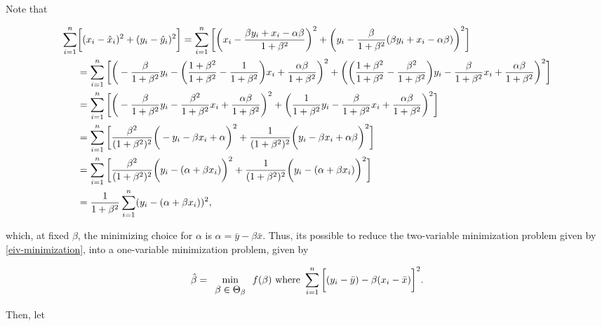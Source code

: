 \documentclass{homework}
\begin{document}
Note that 

\begin{align*}
    \sum_{i=1}^{n} & \bigg[(x_i - \hat{x}_i)^2+(y_i - \hat{y}_i)^2 \bigg] = \sum_{i=1}^{n} \bigg[\bigg(x_i - \frac{\beta y_i+x_i-\alpha\beta}{1+\beta ^2} \bigg)^2 + \bigg(y_i- \frac{\beta}{1+\beta ^2}(\beta y_i + x_i - \alpha \beta )\bigg)^2  \bigg] \\
    &= \sum_{i=1}^{n} \bigg[\bigg(- \frac{\beta}{1+\beta^2} y_i - \bigg(\frac{1+\beta^2}{1+\beta^2}-\frac{1}{1+\beta^2} \bigg)x_i + \frac{\alpha \beta}{1+\beta^2}\bigg)^2 + \bigg(\bigg(\frac{1+\beta^2}{1+\beta^2}- \frac{\beta^2}{1+\beta^2} \bigg)y_i - \frac{\beta}{1+\beta^2}x_i + \frac{\alpha \beta}{1+\beta^2} \bigg)^2 \bigg] \\
    &= \sum_{i=1}^{n} \bigg[\bigg(- \frac{\beta}{1+\beta^2} y_i -\frac{\beta^2}{1+\beta^2} x_i + \frac{\alpha \beta}{1+\beta^2}\bigg)^2 + \bigg( \frac{1}{1+\beta^2}y_i - \frac{\beta}{1+\beta^2}x_i + \frac{\alpha \beta}{1+\beta^2} \bigg)^2 \bigg] \\ 
    &= \sum_{i=1}^{n} \bigg[\frac{\beta^2}{(1+\beta^2)^2}\bigg(-y_i - \beta x_i + \alpha \bigg)^2 + \frac{1}{(1+\beta^2)^2}\bigg(y_i - \beta x_i + \alpha \beta\bigg)^2 \bigg]\\ 
    &= \sum_{i=1}^{n} \bigg[\frac{\beta^2}{(1+\beta^2)^2}\bigg(y_i - (\alpha +\beta x_i) \bigg)^2 + \frac{1}{(1+\beta^2)^2}\bigg(y_i - (\alpha +\beta x_i)\bigg)^2 \bigg] \\
    &= \frac{1}{1+\beta^2} \sum_{i=1}^{n} (y_i - (\alpha +\beta x_i))^2,
\end{align*}

which, at fixed $\beta$, the minimizing choice for $\alpha$ is $\alpha = \bar{y} - \beta \bar{x}$. Thus, its possible to reduce the two-variable minimization problem given by \eqref{eiv-minimization}, into a one-variable minimization problem, given by 

\begin{equation}
    \hat{\beta} = \min_{\begin{array}{c}
        \small{\beta  \in \Theta_{\beta}} 
    \end{array}} f(\beta) \textnormal{ where } \sum_{i=1}^{n} \bigg[(y_i - \bar{y})- \beta(x_i - \bar{x})\bigg]^2
    \label{eiv-minimization}.
\end{equation}

Then, let 
\end{document}

